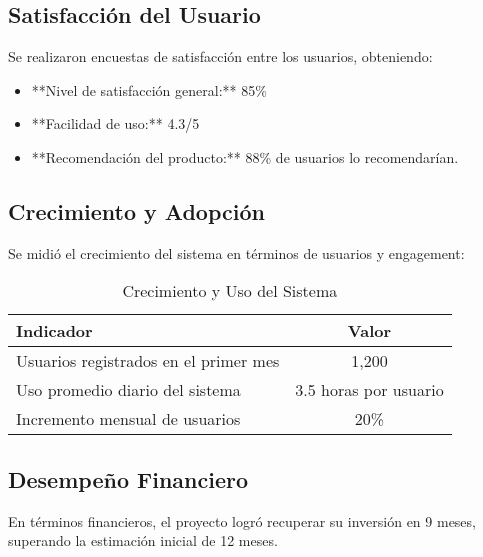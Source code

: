 \subsection{Satisfacción del Usuario}
Se realizaron encuestas de satisfacción entre los usuarios, obteniendo:

\begin{itemize}
	\item **Nivel de satisfacción general:** 85\%
	\item **Facilidad de uso:** 4.3/5
	\item **Recomendación del producto:** 88\% de usuarios lo recomendarían.
\end{itemize}

\subsection{Crecimiento y Adopción}
Se midió el crecimiento del sistema en términos de usuarios y engagement:

\begin{table}[h]
	\centering
	\begin{tabular}{|l|c|}
		\hline
		\textbf{Indicador} & \textbf{Valor} \\ \hline
		Usuarios registrados en el primer mes & 1,200 \\ \hline
		Uso promedio diario del sistema & 3.5 horas por usuario \\ \hline
		Incremento mensual de usuarios & 20\% \\ \hline
	\end{tabular}
	\caption{Crecimiento y Uso del Sistema}
\end{table}

\subsection{Desempeño Financiero}
En términos financieros, el proyecto logró recuperar su inversión en 9 meses, superando la estimación inicial de 12 meses.



